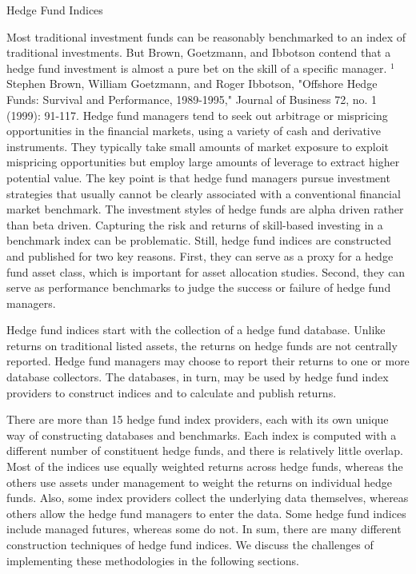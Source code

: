 \documentclass[11pt]{article}
\begin{document}
Hedge Fund Indices

Most traditional investment funds can be reasonably benchmarked to an index of traditional investments. But Brown, Goetzmann, and Ibbotson contend that a hedge fund investment is almost a pure bet on the skill of a specific manager. ${ }^{1}$ Stephen Brown, William Goetzmann, and Roger Ibbotson, "Offshore Hedge Funds: Survival and Performance, 1989-1995," Journal of Business 72, no. 1 (1999): 91-117. Hedge fund managers tend to seek out arbitrage or mispricing opportunities in the financial markets, using a variety of cash and derivative instruments. They typically take small amounts of market exposure to exploit mispricing opportunities but employ large amounts of leverage to extract higher potential value. The key point is that hedge fund managers pursue investment strategies that usually cannot be clearly associated with a conventional financial market benchmark. The investment styles of hedge funds are alpha driven rather than beta driven. Capturing the risk and returns of skill-based investing in a benchmark index can be problematic. Still, hedge fund indices are constructed and published for two key reasons. First, they can serve as a proxy for a hedge fund asset class, which is important for asset allocation studies. Second, they can serve as performance benchmarks to judge the success or failure of hedge fund managers.

Hedge fund indices start with the collection of a hedge fund database. Unlike returns on traditional listed assets, the returns on hedge funds are not centrally reported. Hedge fund managers may choose to report their returns to one or more database collectors. The databases, in turn, may be used by hedge fund index providers to construct indices and to calculate and publish returns.

There are more than 15 hedge fund index providers, each with its own unique way of constructing databases and benchmarks. Each index is computed with a different number of constituent hedge funds, and there is relatively little overlap. Most of the indices use equally weighted returns across hedge funds, whereas the others use assets under management to weight the returns on individual hedge funds. Also, some index providers collect the underlying data themselves, whereas others allow the hedge fund managers to enter the data. Some hedge fund indices include managed futures, whereas some do not. In sum, there are many different construction techniques of hedge fund indices. We discuss the challenges of implementing these methodologies in the following sections.
\end{document}
